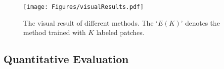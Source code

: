 \documentclass[letterpaper]{article} %
\begin{document}
\begin{comment}
\begin{figure*}[!t]
\centering
\vspace{1em}
\begin{overpic}[scale =0.565]{Figures/visualResult.pdf}
\scriptsize{
\textbf{\put(3,33){Input}
\put(8.8,33){GT}
\put(14.1,33){ReDO}
\put(19.9,33){CAC}
\put(23.6,34){ALSSS}
\put(24.6,32.7){(10)}
\put(29.0,34){ALSSS}
\put(29.5,32.7){(500)}
\put(34.6,34){USSS}
\put(35.2,32.7){(10)}
\put(39.5,34){USSS}
\put(39.6,32.7){(500)}
\put(44.0,33){G-SCNN}
\put(50.5,33){BFP}
\put(55.6,33){Unet}
\put(60.2,33){FPN}
\put(64.4,33){LinkNet}
\put(70.3,33){PSPNet}
\put(75.2,33){PAN}
\put(78.5,33){DeeplabV3+}
\put(86.4,33){$\mathbf{E}(0)$}
\put(90.5,33){$\mathbf{E}(10)$}
\put(95.2,33){$\mathbf{E}(100)$}}
}
\put(0,19.5){\rotatebox{90}{All patch}}
\put(0,2){\rotatebox{90}{MVI patch}}
\end{overpic}
\caption{The visual result of different methods. The `$\mathbf{E}(K)$' denotes the method trained with $K$ labeled patches.
}
\vspace{-1.2em}
\label{fig:visualresults}
\end{figure*}
\end{comment}

\begin{figure*}[!t]
\centering
\vspace{-0.2em}
\texttt{[image: Figures/visualResults.pdf]}
\vspace{-0.4em}
\caption{The visual result of different methods. The `$E(K)$' denotes the method trained with $K$ labeled patches.
}
\vspace{-1.4em}
\label{fig:visualresults}
\end{figure*}

\subsection{Quantitative Evaluation}
\end{document}
